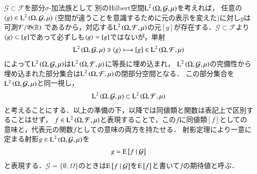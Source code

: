 	$\mathcal{G} \subset \mathcal{F}$を部分$\sigma$-加法族として
	別のHilbert空間$\operatorname{L}^{2} \left(\Omega, \mathcal{G},\mu\right)$を考えれば，
	任意の$\inprod<g> \in \Lp{2}{\Omega, \mathcal{G},\mu}\ $(空間が違うことを意識するために元の表示を変えた)に対し$g$は可測$\mathcal{F}/\mathfrak{B}(\mathbb{R})$
	であるから，対応する$\operatorname{L}^{2} \left(\Omega, \mathcal{F},\mu\right)$の元$[g]$が存在する．$\mathcal{G} \subset \mathcal{F}$より
	$\inprod<g> \subset [g]$であって必ずしも$\inprod<g> = [g]$ではないが，単射
	\begin{align}
		\Lp{2}{\Omega, \mathcal{G},\mu} \ni \inprod<g> \longmapsto [g] \in \Lp{2}{\Omega, \mathcal{F},\mu}
	\end{align}
	によって$\operatorname{L}^{2} \left(\Omega, \mathcal{G},\mu\right)$は$\operatorname{L}^{2} \left(\Omega, \mathcal{F},\mu\right)$に等長に埋め込まれ，
	$\operatorname{L}^{2} \left(\Omega, \mathcal{G},\mu\right)$の完備性から埋め込まれた部分集合は$\operatorname{L}^{2} \left(\Omega, \mathcal{F},\mu\right)$の閉部分空間となる．
	この部分集合を$\operatorname{L}^{2} \left(\Omega, \mathcal{G},\mu\right)$と同一視し，
	\begin{align}
		\operatorname{L}^{2} \left(\Omega, \mathcal{G},\mu\right) \subset \operatorname{L}^{2} \left(\Omega, \mathcal{F},\mu\right)
	\end{align}
	と考えることにする．以上の準備の下，以降では同値類と関数は表記上で区別することはせず，
	$f \in \operatorname{L}^{2} \left(\Omega, \mathcal{F},\mu\right)$と表現することで，この$f$に同値類$[f]$としての意味と，代表元の関数$f$としての意味の両方を持たせる．
	射影定理により一意に定まる射影$g \in \operatorname{L}^{2} \left(\Omega, \mathcal{G},\mu\right)$を
	\begin{align}
		g = \operatorname{E} \left[ f \ \middle|\ \mathcal{G} \right]
	\end{align}
	と表現する．$\mathcal{G} = \{\emptyset, \Omega\}$のときは$\operatorname{E} \left[ f \ \middle|\ \mathcal{G} \right]$を$\operatorname{E} \left[ f \right]$と書いて$f$の期待値と呼ぶ．
